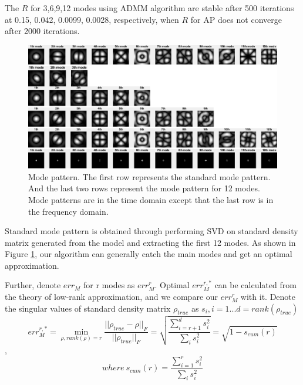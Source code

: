 \documentclass{article}
\numberwithin{equation}{section}
\begin{document}
The $R$ for 3,6,9,12 modes using ADMM algorithm are stable after 500 iterations at 0.15, 0.042, 0.0099, 0.0028, respectively, when $R$ for AP does not converge after 2000 iterations.


\begin{figure}[H]
\centering
\includegraphics[width=1\linewidth]{../figures/modes_combine}
\caption{Mode pattern. The first row represents the standard mode pattern. And the last two rows represent the mode pattern for 12 modes. Mode patterns are in the time domain except that the last row is in the frequency domain.}
\label{fig:modescombine}
\end{figure}

Standard mode pattern is obtained through performing SVD on standard density matrix generated from the model and extracting the first 12 modes. As shown in Figure \ref{fig:modescombine}, our algorithm can generally catch the main modes and get an optimal approximation.

Further, denote $err_M$ for r modes as $err_M^r$. Optimal $err_M^{r,*}$ can be calculated from the theory of low-rank approximation, and we compare our $err_M^r$ with it. Denote the singular values of standard density matrix $\rho_{true}$ as $s_i,i=1...d=rank(\rho_{true})$
 $$
 err_M^{r,*} = \min_{\rho, rank(\rho)=r} \dfrac{||\rho_{true} - \rho||_F}{||\rho_{true}||_F} = \sqrt{\dfrac{\sum_{i=r+1}^{d}s_i^2}{\sum_i s_i^2}}
 =
 \sqrt{1 - s_{cum}(r)}
 $$,
 $$
 where\ 
 s_{cum}(r) = \dfrac{\sum_{i=1}^{r}s_i^2}{\sum_i s_i^2} 
 $$
 
\end{document}
